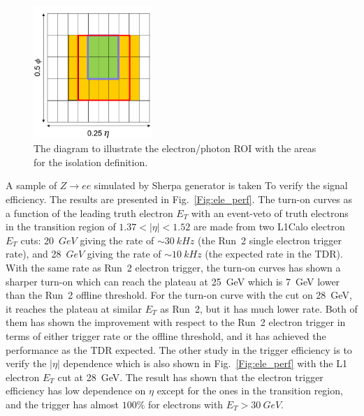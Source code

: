 \begin{figure}[!h]                
	\includegraphics[width=0.4\textwidth]{Chapter6/ele_iso.png}
	\begin{center}
		\caption{The diagram to illustrate the electron/photon ROI with the areas for the isolation definition.}
		\label{Fig:ele_iso}            
	\end{center}
\end{figure}
\noindent
A sample of $Z\to ee$ simulated by Sherpa generator is taken To verify the signal efficiency. The results are presented in Fig.~\ref{Fig:ele_perf}. The turn-on curves as a function of the leading truth electron $E_T$ with an event-veto of truth electrons in the transition region of $1.37<|\eta|<1.52$ are made from two L1Calo electron $E_{T}$ cuts: 20~$GeV$ giving the rate of $\sim30~kHz$ (the Run~2 single electron trigger rate), and 28~$GeV$ giving the rate of $\sim10~kHz$ (the expected rate in the TDR). With the same rate as Run~2 electron trigger, the turn-on curves has shown a sharper turn-on which can reach the plateau at 25~GeV which is 7~GeV lower than the Run~2 offline threshold. For the turn-on curve with the cut on 28~GeV, it reaches the plateau at similar $E_{T}$ as Run~2, but it has much lower rate. Both of them has shown the improvement with respect to the Run~2 electron trigger in terms of either trigger rate or the offline threshold, and it has achieved the performance as the TDR expected. The other study in the trigger efficiency is to verify the $|\eta|$ dependence which is also shown in Fig.~\ref{Fig:ele_perf} with the L1 electron $E_{T}$ cut at 28~GeV. The result has shown that the electron trigger efficiency has low dependence on $\eta$ except for the ones in the transition region, and the trigger has almost $100\%$ for electrons with $E_{T}>30~GeV$.
